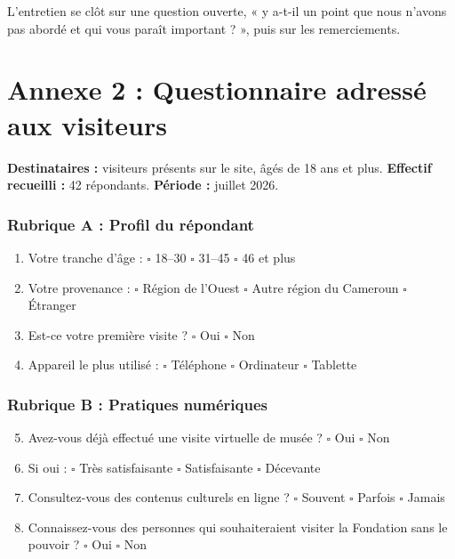 L'entretien se clôt sur une question ouverte, « y a-t-il un point que nous
n'avons pas abordé et qui vous paraît important ? », puis sur les
remerciements.

\cleardoublepage
\chapter*{Annexe 2 : Questionnaire adressé aux visiteurs}
\label{ann:questionnaire}

\textbf{Destinataires :} visiteurs présents sur le site, âgés de 18 ans et plus.
\textbf{Effectif recueilli :} 42 répondants. \textbf{Période :} juillet 2026.

\subsection*{Rubrique A : Profil du répondant}

\begin{enumerate}
  \item Votre tranche d'âge : \quad $\square$ 18--30 \quad $\square$ 31--45 \quad
        $\square$ 46 et plus
  \item Votre provenance : \quad $\square$ Région de l'Ouest \quad
        $\square$ Autre région du Cameroun \quad $\square$ Étranger
  \item Est-ce votre première visite ? \quad $\square$ Oui \quad $\square$ Non
  \item Appareil le plus utilisé : \quad $\square$ Téléphone \quad
        $\square$ Ordinateur \quad $\square$ Tablette
\end{enumerate}

\subsection*{Rubrique B : Pratiques numériques}

\begin{enumerate}\setcounter{enumi}{4}
  \item Avez-vous déjà effectué une visite virtuelle de musée ? \quad
        $\square$ Oui \quad $\square$ Non
  \item Si oui : \quad $\square$ Très satisfaisante \quad
        $\square$ Satisfaisante \quad $\square$ Décevante
  \item Consultez-vous des contenus culturels en ligne ? \quad
        $\square$ Souvent \quad $\square$ Parfois \quad $\square$ Jamais
  \item Connaissez-vous des personnes qui souhaiteraient visiter la Fondation
        sans le pouvoir ? \quad $\square$ Oui \quad $\square$ Non
\end{enumerate}

